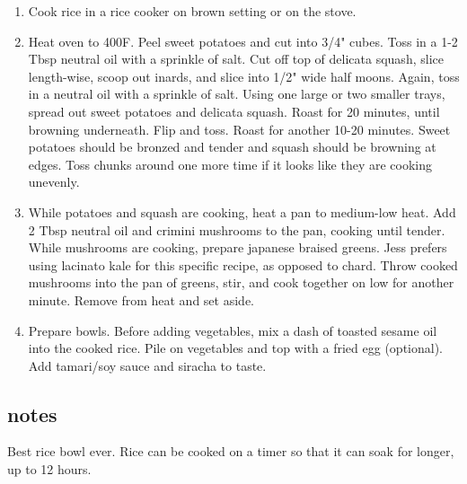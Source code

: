 \documentclass[]{book}
\providecommand{\tightlist}{%
  \setlength{\itemsep}{0pt}\setlength{\parskip}{0pt}}
\begin{document}
\begin{enumerate}
\def\labelenumi{\arabic{enumi}.}
\tightlist
\item
  Cook rice in a rice cooker on brown setting or on the stove.
\item
  Heat oven to 400F. Peel sweet potatoes and cut into 3/4" cubes. Toss in a 1-2 Tbsp neutral oil with a
  sprinkle of salt. Cut off top of delicata squash, slice length-wise, scoop out inards, and slice into 1/2" wide
  half moons. Again, toss in a neutral oil with a sprinkle of salt. Using one large or two smaller trays, spread
  out sweet potatoes and delicata squash. Roast for 20 minutes, until browning underneath. Flip and toss. Roast for
  another 10-20 minutes. Sweet potatoes should be bronzed and tender and squash should be browning at edges. Toss
  chunks around one more time if it looks like they are cooking unevenly.
\item
  While potatoes and squash are cooking, heat a pan to medium-low heat. Add 2 Tbsp neutral oil and crimini mushrooms
  to the pan, cooking until tender. While mushrooms are cooking, prepare japanese braised greens. Jess prefers using
  lacinato kale for this specific recipe, as opposed to chard. Throw cooked mushrooms into the pan of greens, stir, and
  cook together on low for another minute. Remove from heat and set aside.
\item
  Prepare bowls. Before adding vegetables, mix a dash of toasted sesame oil into the cooked rice. Pile on vegetables
  and top with a fried egg (optional). Add tamari/soy sauce and siracha to taste.
\end{enumerate}

\hypertarget{notes-28}{%
\subsection{notes}\label{notes-28}}

Best rice bowl ever. Rice can be cooked on a timer so that it can soak for longer, up to 12 hours.


\end{document}
